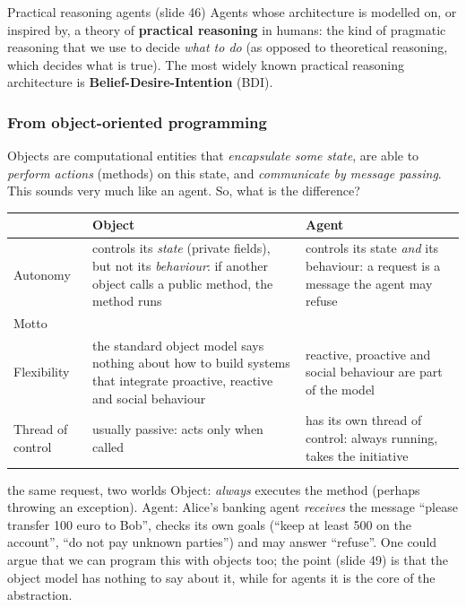 \begin{nbdef}{Practical reasoning agents (slide 46)}
Agents whose architecture is modelled on, or inspired by, a theory of \textbf{practical
reasoning} in humans: the kind of pragmatic reasoning that we use to decide \emph{what to
do} (as opposed to theoretical reasoning, which decides what is true). The most widely known
practical reasoning architecture is \textbf{Belief-Desire-Intention} (BDI).
\end{nbdef}

\subsubsection{From object-oriented programming}

Objects are computational entities that \emph{encapsulate some state}, are able to
\emph{perform actions} (methods) on this state, and \emph{communicate by message passing}.
This sounds very much like an agent. So, what is the difference?

\begin{center}
\small
\begin{tabularx}{\linewidth}{@{}l >{\raggedright\arraybackslash}X >{\raggedright\arraybackslash}X@{}}
\toprule
 & \textbf{Object} & \textbf{Agent} \\
\midrule
Autonomy & controls its \emph{state} (private fields), but not its \emph{behaviour}: if
  another object calls a public method, the method runs & controls its state \emph{and} its
  behaviour: a request is a message the agent may refuse \\
Motto & \multicolumn{2}{c}{``Objects do it for free; agents do it for money.''} \\
Flexibility & the standard object model says nothing about how to build systems that
  integrate proactive, reactive and social behaviour & reactive, proactive and social
  behaviour are part of the model \\
Thread of control & usually passive: acts only when called & has its own thread of
  control: always running, takes the initiative \\
\bottomrule
\end{tabularx}
\end{center}

\begin{nbexample}{the same request, two worlds}
\notinslides
Object:  \emph{always} executes the method (perhaps throwing
an exception). Agent: Alice's banking agent \emph{receives} the message ``please transfer
100 euro to Bob'', checks its own goals (``keep at least 500 on the account'', ``do not pay
unknown parties'') and may answer ``refuse''. One could argue that we can program this with
objects too; the point (slide 49) is that the object model has nothing to say about it,
while for agents it is the core of the abstraction.
\end{nbexample}


